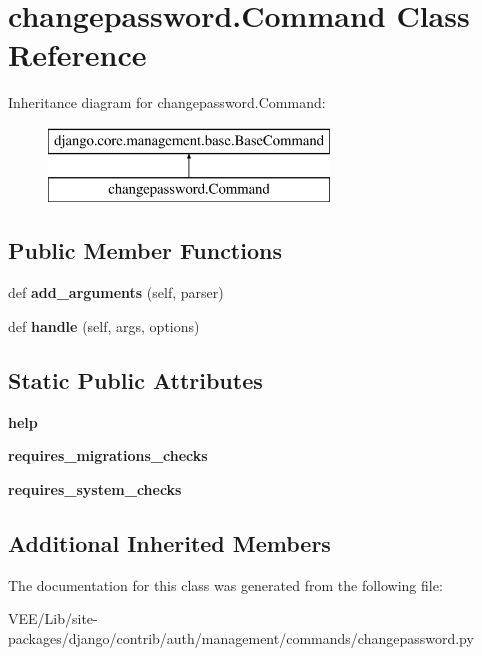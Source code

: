 \hypertarget{classchangepassword_1_1_command}{}\section{changepassword.\+Command Class Reference}
\label{classchangepassword_1_1_command}
Inheritance diagram for changepassword.\+Command\+:\begin{figure}[H]
\begin{center}
\leavevmode
\includegraphics[height=2.000000cm]{classchangepassword_1_1_command}
\end{center}
\end{figure}
\subsection*{Public Member Functions}
\begin{DoxyCompactItemize}
\item 
\mbox{\label{classchangepassword_1_1_command_a6591dd5c9af37f442d8ac98ff266556f}} 
def {\bfseries add\+\_\+arguments} (self, parser)
\item 
\mbox{\label{classchangepassword_1_1_command_a3da1a47bf693d98abe27aaa3290d3d09}} 
def {\bfseries handle} (self, args, options)
\end{DoxyCompactItemize}
\subsection*{Static Public Attributes}
\begin{DoxyCompactItemize}
\item 
\mbox{\label{classchangepassword_1_1_command_a56d32fe19a0099bfcfde8bf304022d09}} 
{\bfseries help}
\item 
\mbox{\label{classchangepassword_1_1_command_a63d721dc7ee5d6d798bbb4ad9b309144}} 
{\bfseries requires\+\_\+migrations\+\_\+checks}
\item 
\mbox{\label{classchangepassword_1_1_command_abaade9d1694704cfc9d2cfd59ca20b28}} 
{\bfseries requires\+\_\+system\+\_\+checks}
\end{DoxyCompactItemize}
\subsection*{Additional Inherited Members}


The documentation for this class was generated from the following file\+:\begin{DoxyCompactItemize}
\item 
V\+E\+E/\+Lib/site-\/packages/django/contrib/auth/management/commands/changepassword.\+py\end{DoxyCompactItemize}
